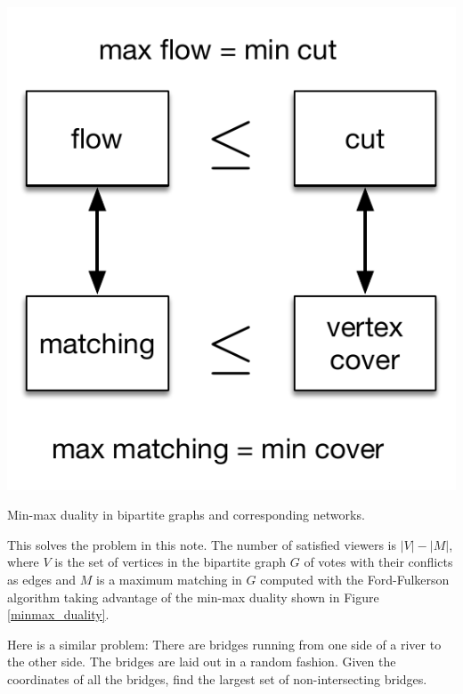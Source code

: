 \begin{marginfigure}
    \includegraphics[scale=0.5]{flowcutminmax.pdf}
    \caption{Min-max duality in bipartite graphs and corresponding networks.}
	\label{minmax_duality}
\end{marginfigure}{}

This solves the problem in this note. The number of satisfied viewers is $|V| - |M|$, where $V$ is the set of vertices in the bipartite graph $G$ of votes with their conflicts as edges and $M$ is a maximum matching in $G$ computed with the Ford-Fulkerson algorithm taking advantage of the min-max duality shown in Figure \ref{minmax_duality}.

Here is a similar problem: There are bridges running from one side of a river to the other side. The bridges are laid out in a random fashion. Given the coordinates of all the bridges, find the largest set of non-intersecting bridges. 






